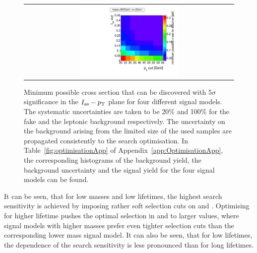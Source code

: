 \begin{figure}[!h]
\begin{tabular}{c}
    \includegraphics[width=0.49\textwidth]{figures/analysis/Optimisation/Madgraph_signal_mass_500_ctau_50cm_ECaloLe5_SOverDeltaBStatPlusSys.pdf} 
  \end{tabular}
  \caption{Minimum possible cross section that can be discovered with 5$\sigma$ significance in the $I_{\text{as}}-p_{\text{T}}$ plane for four different signal models.
           The systematic uncertainties are taken to be 20\% and 100\% for the fake and the leptonic background respectively.
           The uncertainty on the background arising from the limited size of the used samples are propagated consistently to the search optimisation.
           In Table~\ref{fig:optimisationApp} of Appendix~\ref{app:OptimisationApp}, the corresponding histograms of the background yield, the background uncertainty and the signal yield for the four signal models can be found.}
  \vspace{30pt}
  \label{fig:optimisation}
\end{figure} 
It can be seen, that for low masses and low lifetimes, the highest search sensitivity is achieved by imposing rather soft selection cuts on \ias and \pt.
Optimising for higher lifetime pushes the optimal selection in \pt and \ias to larger values, where signal models with higher masses prefer even tighter \ias selection cuts than the corresponding lower mass signal model.
It can also be seen, that for low lifetimes, the \pt dependence of the search sensitivity is less pronounced than for long lifetimes.\\

